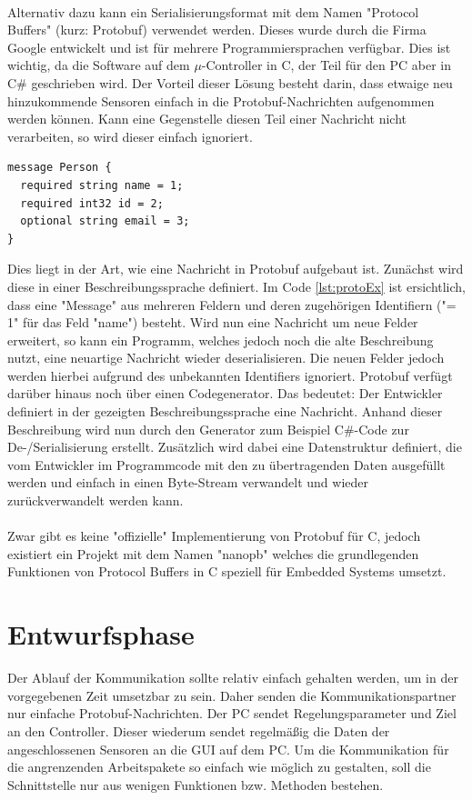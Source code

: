 \paragraph{}
Alternativ dazu kann ein Serialisierungsformat mit dem Namen "Protocol Buffers" (kurz: Protobuf)  verwendet werden. Dieses wurde durch die Firma Google entwickelt und ist für mehrere Programmiersprachen verfügbar. Dies ist wichtig, da die Software auf dem $\mu$-Controller in C, der Teil für den PC aber in C\# geschrieben wird. Der Vorteil dieser Lösung besteht darin, dass etwaige neu hinzukommende Sensoren einfach in die Protobuf-Nachrichten aufgenommen werden können. Kann eine Gegenstelle diesen Teil einer Nachricht nicht verarbeiten, so wird dieser einfach ignoriert.
\pagebreak
\begin{lstlisting}[frame=single, caption=Beispieldefinition einer Protocol Buffers Nachricht, label=lst:protoEx]
message Person {
  required string name = 1;
  required int32 id = 2;
  optional string email = 3;
}
\end{lstlisting}
Dies liegt in der Art, wie eine Nachricht in Protobuf aufgebaut ist. Zunächst wird diese in einer Beschreibungssprache definiert.
Im Code \ref{lst:protoEx} ist ersichtlich, dass eine "Message" aus mehreren Feldern und deren zugehörigen Identifiern ("= 1" für das Feld "name") besteht. Wird nun eine Nachricht um neue Felder erweitert, so kann ein Programm, welches jedoch noch die alte Beschreibung nutzt, eine neuartige Nachricht wieder deserialisieren. Die neuen Felder jedoch werden hierbei aufgrund des unbekannten Identifiers ignoriert. Protobuf verfügt darüber hinaus noch über einen Codegenerator. Das bedeutet: Der Entwickler definiert in der gezeigten Beschreibungssprache eine Nachricht. Anhand dieser Beschreibung wird nun durch den Generator zum Beispiel C\#-Code zur De-/Serialisierung erstellt. Zusätzlich wird dabei eine Datenstruktur definiert, die vom Entwickler im Programmcode mit den zu übertragenden Daten ausgefüllt werden und einfach in einen Byte-Stream verwandelt und wieder zurückverwandelt werden kann.
\paragraph{}
Zwar gibt es keine "offizielle" Implementierung von Protobuf für C, jedoch existiert ein Projekt mit dem Namen "nanopb" welches die grundlegenden Funktionen von Protocol Buffers in C speziell für Embedded Systems umsetzt.
\section{Entwurfsphase}
Der Ablauf der Kommunikation sollte relativ einfach gehalten werden, um in der vorgegebenen Zeit umsetzbar zu sein. Daher senden die Kommunikationspartner nur einfache Protobuf-Nachrichten. Der PC sendet Regelungsparameter und Ziel an den Controller. Dieser wiederum sendet regelmäßig die Daten der angeschlossenen Sensoren an die GUI auf dem PC. Um die Kommunikation für die angrenzenden Arbeitspakete so einfach wie möglich zu gestalten, soll die Schnittstelle nur aus wenigen Funktionen bzw. Methoden bestehen.
